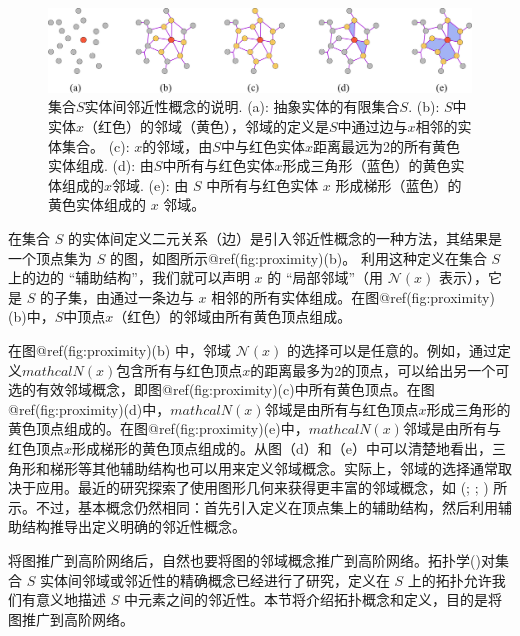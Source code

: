\documentclass[
  12pt,
]{krantz}
\begin{document}
\begin{figure}

{\centering \includegraphics{figures/proximity} 

}

\caption{集合$S$实体间邻近性概念的说明. (a): 抽象实体的有限集合$S$. (b): $S$中实体$x$（红色）的邻域（黄色），邻域的定义是$S$中通过边与$x$相邻的实体集合。 (c): $x$的邻域，由$S$中与红色实体$x$距离最远为2的所有黄色实体组成. (d): 由$S$中所有与红色实体$x$形成三角形（蓝色）的黄色实体组成的$x$邻域. (e): 由 $S$ 中所有与红色实体 $x$ 形成梯形（蓝色）的黄色实体组成的 $x$ 邻域。}\label{fig:proximity}
\end{figure}

在集合 \(S\)
的实体间定义二元关系（边）是引入邻近性概念的一种方法，其结果是一个顶点集为
\(S\) 的图，如图所示@ref(fig:proximity)(b)。 利用这种定义在集合 \(S\)
上的边的 ``辅助结构''，我们就可以声明 \(x\) 的 ``局部邻域''（用
\(\mathcal{N}(x)\) 表示），它是 \(S\) 的子集，由通过一条边与 \(x\)
相邻的所有实体组成。在图@ref(fig:proximity)(b)中，\(S\)中顶点\(x\)（红色）的邻域由所有黄色顶点组成。

在图@ref(fig:proximity)(b) 中，邻域 \(\mathcal{N}(x)\)
的选择可以是任意的。例如，通过定义\(mathcal{N}(x)\)包含所有与红色顶点\(x\)的距离最多为2的顶点，可以给出另一个可选的有效邻域概念，即图@ref(fig:proximity)(c)中所有黄色顶点。在图@ref(fig:proximity)(d)中，\(mathcal{N}(x)\)邻域是由所有与红色顶点\(x\)形成三角形的黄色顶点组成的。在图@ref(fig:proximity)(e)中，\(mathcal{N}(x)\)邻域是由所有与红色顶点\(x\)形成梯形的黄色顶点组成的。从图（d）和（e）中可以清楚地看出，三角形和梯形等其他辅助结构也可以用来定义邻域概念。实际上，邻域的选择通常取决于应用。最近的研究探索了使用图形几何来获得更丰富的邻域概念，如
(;
;
)
所示。不过，基本概念仍然相同：首先引入定义在顶点集上的辅助结构，然后利用辅助结构推导出定义明确的邻近性概念。

将图推广到高阶网络后，自然也要将图的邻域概念推广到高阶网络。拓扑学()对集合 \(S\) 实体间邻域或邻近性的精确概念已经进行了研究，定义在
\(S\) 上的拓扑允许我们有意义地描述 \(S\)
中元素之间的邻近性。本节将介绍拓扑概念和定义，目的是将图推广到高阶网络。
\end{document}
